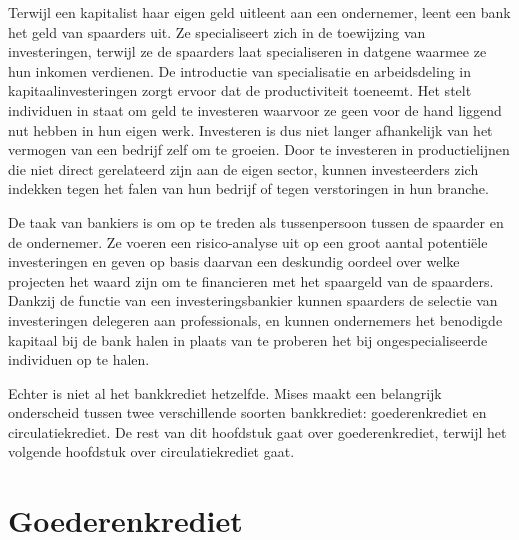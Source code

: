 Terwijl een kapitalist haar eigen geld uitleent aan een ondernemer, leent een bank het geld van spaarders uit. Ze specialiseert zich in de toewijzing van investeringen, terwijl ze de spaarders laat specialiseren in datgene waarmee ze hun inkomen verdienen. De introductie van specialisatie en arbeidsdeling in kapitaalinvesteringen zorgt ervoor dat de productiviteit toeneemt. Het stelt individuen in staat om geld te investeren waarvoor ze geen voor de hand liggend nut hebben in hun eigen werk. Investeren is dus niet langer afhankelijk van het vermogen van een bedrijf zelf om te groeien. Door te investeren in productielijnen die niet direct gerelateerd zijn aan de eigen sector, kunnen investeerders zich indekken tegen het falen van hun bedrijf of tegen verstoringen in hun branche.

De taak van bankiers is om op te treden als tussenpersoon tussen de spaarder en de ondernemer. Ze voeren een risico-analyse uit op een groot aantal potentiële investeringen en geven op basis daarvan een deskundig oordeel over welke projecten het waard zijn om te financieren met het spaargeld van de spaarders. Dankzij de functie van een investeringsbankier kunnen spaarders de selectie van investeringen delegeren aan professionals, en kunnen ondernemers het benodigde kapitaal bij de bank halen in plaats van te proberen het bij ongespecialiseerde individuen op te halen.

Echter is niet al het bankkrediet hetzelfde. Mises maakt een belangrijk onderscheid tussen twee verschillende soorten bankkrediet: goederenkrediet en circulatiekrediet.\autocite{156} De rest van dit hoofdstuk gaat over goederenkrediet, terwijl het volgende hoofdstuk over circulatiekrediet gaat.

\hypertarget{goederenkrediet}{%
\section{Goederenkrediet}\label{goederenkrediet}}

